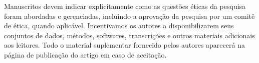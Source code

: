 \documentclass[portuguese]{sbc2025}%
\begin{document}
\begin{declarations}
\begin{furtherinformation}
Manuscritos devem indicar explicitamente como as questões éticas da pesquisa foram abordadas e gerenciadas, 
incluindo a aprovação da pesquisa por um comitê de ética, quando aplicável.
Incentivamos os autores a disponibilizarem seus conjuntos de dados, métodos, softwares, 
transcrições e outros materiais adicionais aos leitores. 
Todo o material suplementar fornecido pelos autores aparecerá na página de publicação do artigo em caso de aceitação. 
\end{furtherinformation}

\end{declarations}



\end{document}
